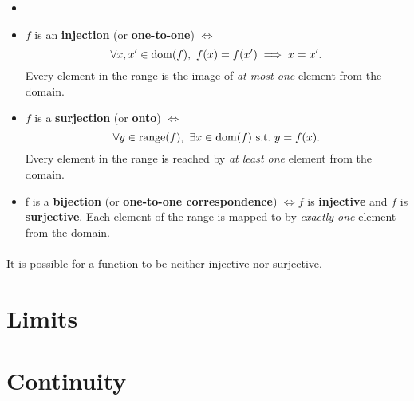 \documentclass[../real_analysis.tex]{subfiles}
\begin{document}
        \begin{definition}
            \begin{itemize} \item[]
                \item $f$ is an \textbf{injection} (or \textbf{one-to-one}) $\iff$
                \[\forall x, x^\prime \in \operatorname{dom}(f),\ {f(x) = f(x^\prime) \implies x = x^\prime}.\] Every element in the range is the image of \textit{at most one} element from the domain.
                \item $f$ is a \textbf{surjection} (or \textbf{onto}) $\iff$
                \[\forall y \in \operatorname{range}(f),\ \exists x \in \operatorname{dom}(f)\  \text{s.t.}\ y = f(x).\]
                Every element in the range is reached by \textit{at least one} element from the domain.
                \item f is a \textbf{bijection} (or \textbf{one-to-one correspondence}) $\iff f$ is \textbf{injective} and $f$ is \textbf{surjective}. Each element of the range is mapped to by \textit{exactly one} element from the domain.
            \end{itemize}
            \paragraph{}
            It is possible for a function to be neither  injective nor surjective.
        \end{definition}

    \section{Limits}

    \section{Continuity}
\end{document}
